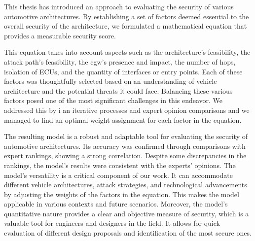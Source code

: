 This thesis has introduced an approach to evaluating the security of various automotive architectures. 
By establishing a set of factors deemed essential to the overall security of the architecture, 
we formulated a mathematical equation that provides a measurable security score.\par
This equation takes into account aspects such as the architecture's feasibility, the attack path's feasibility, 
the \acrlong{cgw}'s presence and impact, the number of hops, isolation of ECUs, and the quantity of interfaces or entry points. 
Each of these factors was thoughtfully selected based on an understanding of vehicle architecture and the potential threats it could face.
Balancing these various factors posed one of the most significant challenges in this endeavor. 
We addressed this by i an iterative processes and expert opinion comparisons and
we managed to find an optimal weight assignment for each factor in the equation.\par
The resulting model is a robust and adaptable tool for evaluating the security of automotive architectures. 
Its accuracy was confirmed through comparisons with expert rankings, showing a strong correlation. 
Despite some discrepancies in the rankings, the model's results were consistent with the experts' opinions.
The model's versatility is a critical component of our work.
It can accommodate different vehicle architectures, attack strategies, 
and technological advancements by adjusting the weights of the factors in the equation. 
This makes the model applicable in various contexts and future scenarios.
Moreover, the model's quantitative nature provides a clear and objective measure of security, 
which is a valuable tool for engineers and designers in the field. 
It allows for quick evaluation of different design proposals and identification of the most secure ones.\\

\newpage

